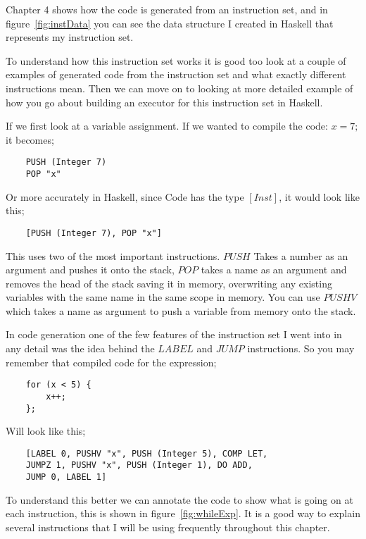 Chapter 4 shows how the code is generated from an instruction set, and in figure~\ref{fig:instData} you can see the data structure I created in Haskell that represents my instruction set. 

To understand how this instruction set works it is good too look at a couple of examples of generated code from the instruction set and what exactly different instructions mean. Then we can move on to looking at more detailed example of how you go about building an executor for this instruction set in Haskell. 

If we first look at a variable assignment. If we wanted to compile the code: $x = 7;$ it becomes;

\begin{lstlisting}
	PUSH (Integer 7)
	POP "x"
\end{lstlisting}

Or more accurately in Haskell, since Code has the type $[Inst]$, it would look like this;

\begin{lstlisting}
	[PUSH (Integer 7), POP "x"]
\end{lstlisting}

This uses two of the most important instructions. $PUSH$ Takes a number as an argument and pushes it onto the stack, $POP$ takes a name as an argument and removes the head of the stack saving it in memory, overwriting any existing variables with the same name in the same scope in memory. You can use $PUSHV$ which takes a name as argument to push a variable from memory onto the stack. 

\newpage

In code generation one of the few features of the instruction set I went into in any detail was the idea behind the $LABEL$ and $JUMP$ instructions. So you may remember that compiled code for the expression;

\begin{lstlisting}
	for (x < 5) {
		x++;
	};
\end{lstlisting}

Will look like this;

\begin{lstlisting}
	[LABEL 0, PUSHV "x", PUSH (Integer 5), COMP LET, 
	JUMPZ 1, PUSHV "x", PUSH (Integer 1), DO ADD, 
	JUMP 0, LABEL 1]			
\end{lstlisting}

To understand this better we can annotate the code to show what is going on at each instruction, this is shown in figure~\ref{fig:whileExp}. It is a good way to explain several instructions that I will be using frequently throughout this chapter.

